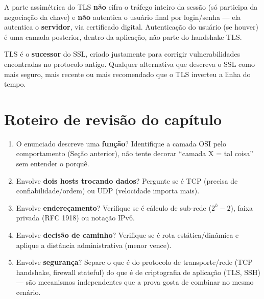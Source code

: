\begin{cuidado}
A parte assimétrica do TLS \textbf{não} cifra o tráfego inteiro da sessão
(só participa da negociação da chave) e \textbf{não} autentica o usuário
final por login/senha --- ela autentica o \textbf{servidor}, via
certificado digital. Autenticação do usuário (se houver) é uma camada
posterior, dentro da aplicação, não parte do handshake TLS.
\end{cuidado}

\begin{cuidado}
TLS é o \textbf{sucessor} do SSL, criado justamente para corrigir
vulnerabilidades encontradas no protocolo antigo. Qualquer alternativa que
descreva o SSL como mais seguro, mais recente ou mais recomendado que o TLS
inverteu a linha do tempo.
\end{cuidado}

\section{Roteiro de revisão do capítulo}

\begin{regrapratica}
\begin{enumerate}
\item O enunciado descreve uma \textbf{função}? Identifique a camada OSI
pelo comportamento (Seção anterior), não tente decorar “camada X = tal
coisa” sem entender o porquê.
\item Envolve \textbf{dois hosts trocando dados}? Pergunte se é TCP
(precisa de confiabilidade/ordem) ou UDP (velocidade importa mais).
\item Envolve \textbf{endereçamento}? Verifique se é cálculo de sub-rede
($2^h - 2$), faixa privada (RFC 1918) ou notação IPv6.
\item Envolve \textbf{decisão de caminho}? Verifique se é rota
estática/dinâmica e aplique a distância administrativa (menor vence).
\item Envolve \textbf{segurança}? Separe o que é do protocolo de
transporte/rede (TCP handshake, firewall stateful) do que é de
criptografia de aplicação (TLS, SSH) --- são mecanismos independentes que a
prova gosta de combinar no mesmo cenário.
\end{enumerate}
\end{regrapratica}
